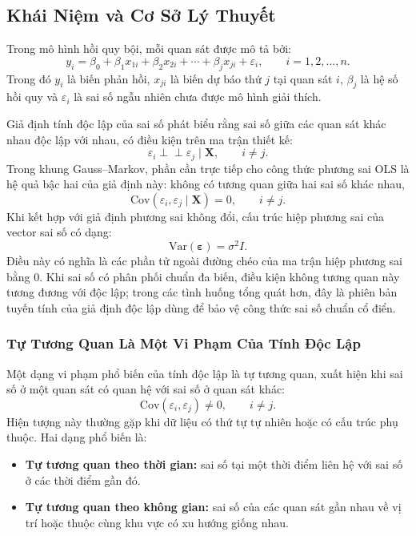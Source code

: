 \subsection{Khái Niệm và Cơ Sở Lý Thuyết}

Trong mô hình hồi quy bội, mỗi quan sát được mô tả bởi:
\[
  y_i = \beta_0 + \beta_1x_{1i} + \beta_2x_{2i} + \cdots + \beta_jx_{ji} + \varepsilon_i,
  \qquad i = 1,2,\ldots,n.
\]
Trong đó $y_i$ là biến phản hồi, $x_{ji}$ là biến dự báo thứ $j$ tại quan sát $i$, $\beta_j$ là hệ số hồi quy và $\varepsilon_i$ là sai số ngẫu nhiên chưa được mô hình giải thích.

Giả định tính độc lập của sai số phát biểu rằng sai số giữa các quan sát khác nhau độc lập với nhau, có điều kiện trên ma trận thiết kế:
\[
  \varepsilon_i \perp\!\!\!\perp \varepsilon_j \mid \mathbf{X},
  \qquad i\neq j.
\]
Trong khung Gauss--Markov, phần cần trực tiếp cho công thức phương sai OLS là hệ quả bậc hai của giả định này: không có tương quan giữa hai sai số khác nhau,
\[
  \mathrm{Cov}(\varepsilon_i,\varepsilon_j\mid \mathbf{X})=0,
  \qquad i\neq j.
\]
Khi kết hợp với giả định phương sai không đổi, cấu trúc hiệp phương sai của vector sai số có dạng:
\[
  \mathrm{Var}(\boldsymbol{\varepsilon})=\sigma^2 I.
\]
Điều này có nghĩa là các phần tử ngoài đường chéo của ma trận hiệp phương sai bằng $0$. Khi sai số có phân phối chuẩn đa biến, điều kiện không tương quan này tương đương với độc lập; trong các tình huống tổng quát hơn, đây là phiên bản tuyến tính của giả định độc lập dùng để bảo vệ công thức sai số chuẩn cổ điển.

\subsubsection{Tự Tương Quan Là Một Vi Phạm Của Tính Độc Lập}

Một dạng vi phạm phổ biến của tính độc lập là tự tương quan, xuất hiện khi sai số ở một quan sát có quan hệ với sai số ở quan sát khác:
\[
  \mathrm{Cov}(\varepsilon_i,\varepsilon_j)\neq 0,
  \qquad i\neq j.
\]
Hiện tượng này thường gặp khi dữ liệu có thứ tự tự nhiên hoặc có cấu trúc phụ thuộc. Hai dạng phổ biến là:
\begin{itemize}
  \item \textbf{Tự tương quan theo thời gian:} sai số tại một thời điểm liên hệ với sai số ở các thời điểm gần đó.
  \item \textbf{Tự tương quan theo không gian:} sai số của các quan sát gần nhau về vị trí hoặc thuộc cùng khu vực có xu hướng giống nhau.
\end{itemize}

